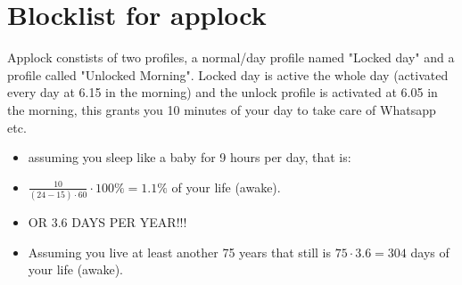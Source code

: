 \newpage
\section{Blocklist for applock}\label{app:b}
Applock constists of two profiles, a normal/day profile named "Locked day" and a profile called "Unlocked Morning". Locked day is active the whole day (activated every day at 6.15 in the morning) and the unlock profile is activated at 6.05 in the morning, this grants you 10 minutes of your day to take care of Whatsapp etc.

\begin{itemize}
    \item assuming you sleep like a baby for 9 hours per day, that is:
    \item  $\frac{10}{(24-15)\cdot 60}\cdot 100\% = 1.1\%$ of your life (awake).
    \item OR 3.6 DAYS PER YEAR!!! 
    \item Assuming you live at least  another 75 years that still is $75\cdot 3.6=304 $ days of your life (awake). 
\end{itemize} 

